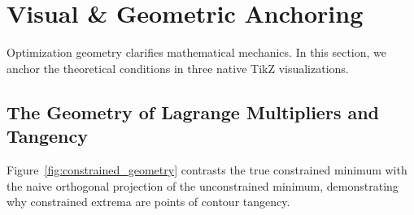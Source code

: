 \section{Visual \& Geometric Anchoring}

Optimization geometry clarifies mathematical mechanics. In this section, we anchor the theoretical conditions in three native TikZ visualizations.

\subsection{The Geometry of Lagrange Multipliers and Tangency}
Figure~\ref{fig:constrained_geometry} contrasts the true constrained minimum with the naive orthogonal projection of the unconstrained minimum, demonstrating why constrained extrema are points of contour tangency.

